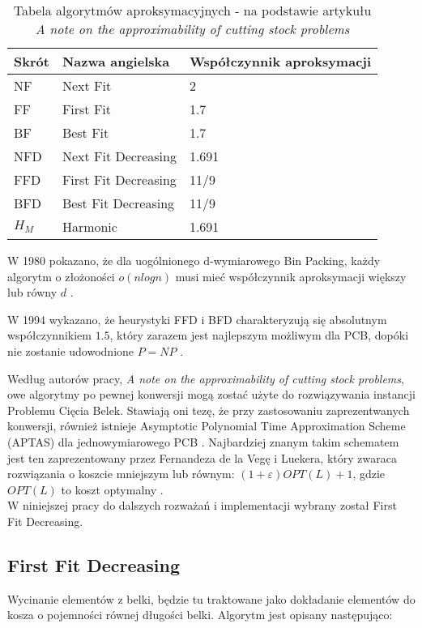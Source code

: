 \begin{table}[!h] 
\begin{center}
	\begin{tabular}{ |p{3cm}||p{5cm}|p{3cm}|  }
		\hline
		Skrót & Nazwa angielska & Współczynnik aproksymacji\\
		\hline
		NF   & Next Fit & 2\\
		FF & First Fit & 1.7\\
		BF & Best Fit & 1.7\\
		NFD & Next Fit Decreasing &  1.691\\
		FFD & First Fit Decreasing & 11/9\\
		BFD & Best Fit Decreasing & 11/9\\
		$H_M$ & Harmonic & 1.691\\	
		\hline
	\end{tabular}
	\caption{\label{APPROX_RATIOS}Tabela algorytmów aproksymacyjnych - na podstawie artykułu \textit{A note on the approximability of cutting stock problems} }
\end{center}
\end{table}

W 1980 pokazano, że dla uogólnionego d-wymiarowego Bin Packing, każdy algorytm o złożoności $o(nlogn)$ musi mieć współczynnik aproksymacji większy lub równy $d$ \cite{APPROX_RATIO}.

W 1994 wykazano, że heurystyki FFD i BFD charakteryzują się absolutnym współczynnikiem $1.5$, który zarazem jest najlepszym możliwym dla PCB, dopóki nie zostanie udowodnione $P=NP$ \cite{WORST_CASE_APPROX}.

Według autorów pracy, \textit{A note on the approximability of cutting stock problems}, owe algorytmy po pewnej konwersji mogą zostać użyte do rozwiązywania instancji Problemu Cięcia Belek. Stawiają oni tezę, że przy zastosowaniu zaprezentwanych konwersji, również istnieje Asymptotic Polynomial Time Approximation Scheme (APTAS) dla jednowymiarowego PCB \cite{NOTE_ON_APPROX}.
Najbardziej znanym takim schematem jest ten zaprezentowany przez Fernandeza de la Vegę i Luekera, który zwaraca rozwiązania o koszcie mniejszym lub równym: $(1+\varepsilon)OPT(L) + 1$, gdzie $OPT(L)$ to koszt optymalny \cite{APTAS}. \\

W niniejszej pracy do dalszych rozważań i implementacji wybrany został First Fit Decreasing.

\subsection{First Fit Decreasing}  \label{approx_pseudocode}
Wycinanie elementów z belki, będzie tu traktowane jako dokładanie elementów do kosza o pojemności równej długości belki.
Algorytm jest opisany następująco:


